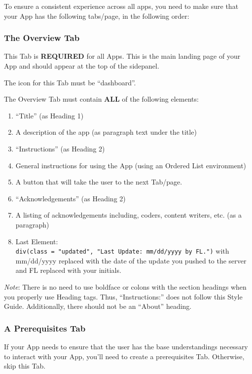 \documentclass[]{book}
\providecommand{\tightlist}{%
  \setlength{\itemsep}{0pt}\setlength{\parskip}{0pt}}
\begin{document}
To ensure a consistent experience across all apps, you need to make sure that your App has the following tabs/page, in the following order:

\hypertarget{the-overview-tab}{%
\subsubsection{The Overview Tab}\label{the-overview-tab}}

This Tab is \textbf{REQUIRED} for all Apps. This is the main landing page of your App and should appear at the top of the sidepanel.

The icon for this Tab must be ``dashboard''.

The Overview Tab must contain \textbf{ALL} of the following elements:

\begin{enumerate}
\def\labelenumi{\arabic{enumi}.}
\tightlist
\item
  ``Title'' (as Heading 1)
\item
  A description of the app (as paragraph text under the title)
\item
  ``Instructions'' (as Heading 2)
\item
  General instructions for using the App (using an Ordered List environment)
\item
  A button that will take the user to the next Tab/page.
\item
  ``Acknowledgements'' (as Heading 2)
\item
  A listing of acknowledgements including, coders, content writers, etc. (as a paragraph)
\item
  Last Element: \texttt{div(class\ =\ "updated",\ "Last\ Update:\ mm/dd/yyyy\ by\ FL.")} with mm/dd/yyyy replaced with the date of the update you pushed to the server and FL replaced with your initials.
\end{enumerate}

\emph{Note}: There is no need to use boldface or colons with the section headings when you properly use Heading tags. Thus, ``Instructions:'' does not follow this Style Guide. Additionally, there should not be an ``About'' heading.

\hypertarget{a-prerequisites-tab}{%
\subsubsection{A Prerequisites Tab}\label{a-prerequisites-tab}}

If your App needs to ensure that the user has the base understandings necessary to interact with your App, you'll need to create a prerequisites Tab. Otherwise, skip this Tab.
\end{document}
